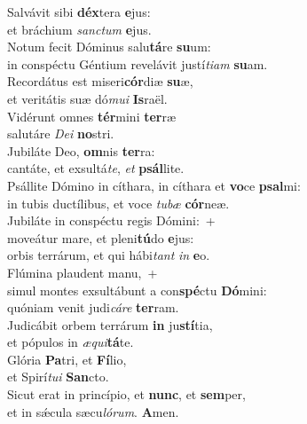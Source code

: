 \evenverse Salvávit sibi \textbf{déx}tera \textbf{e}jus:~\*\\
\evenverse et bráchium \textit{san}\textit{ctum} \textbf{e}jus.\\
\oddverse Notum fecit Dóminus salu\textbf{tá}re \textbf{su}um:~\*\\
\oddverse in conspéctu Géntium revelávit justí\textit{ti}\textit{am} \textbf{su}am.\\
\evenverse Recordátus est miseri\textbf{cór}diæ \textbf{su}æ,~\*\\
\evenverse et veritátis suæ dó\textit{mu}\textit{i} \textbf{Is}raël.\\
\oddverse Vidérunt omnes \textbf{tér}mini \textbf{ter}ræ~\*\\
\oddverse salutáre \textit{De}\textit{i} \textbf{no}stri.\\
\evenverse Jubiláte Deo, \textbf{om}nis \textbf{ter}ra:~\*\\
\evenverse cantáte, et exsultá\textit{te}, \textit{et} \textbf{psál}lite.\\
\oddverse Psállite Dómino in cíthara, in cíthara et \textbf{vo}ce \textbf{psal}mi:~\*\\
\oddverse in tubis ductílibus, et voce \textit{tu}\textit{bæ} \textbf{cór}neæ.\\
\evenverse Jubiláte in conspéctu regis Dómini:~+\\
\evenverse  moveátur mare, et pleni\textbf{tú}do \textbf{e}jus:~\*\\
\evenverse orbis terrárum, et qui hábi\textit{tant} \textit{in} \textbf{e}o.\\
\oddverse Flúmina plaudent manu,~+\\
\oddverse  simul montes exsultábunt a con\textbf{spé}ctu \textbf{Dó}mini:~\*\\
\oddverse quóniam venit judi\textit{cá}\textit{re} \textbf{ter}ram.\\
\evenverse Judicábit orbem terrárum \textbf{in} ju\textbf{stí}tia,~\*\\
\evenverse et pópulos in \textit{æ}\textit{qui}\textbf{tá}te.\\
\oddverse Glória \textbf{Pa}tri, et \textbf{Fí}lio,~\*\\
\oddverse et Spirí\textit{tu}\textit{i} \textbf{San}cto.\\
\evenverse Sicut erat in princípio, et \textbf{nunc}, et \textbf{sem}per,~\*\\
\evenverse et in sǽcula sæcu\textit{ló}\textit{rum}. \textbf{A}men.\\
